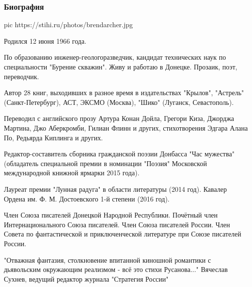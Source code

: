  
 
 

\subsubsection{Биография}

\ifcmt
pic https://stihi.ru/photos/brendarcher.jpg
\fi

Родился 12 июня 1966 года.

По образованию инженер-геологоразведчик, кандидат технических наук по
специальности "Бурение скважин". Живу и работаю в Донецке.  Прозаик, поэт,
переводчик.

Автор 28 книг, выходивших в разное время в издательствах "Крылов", "Астрель"
(Санкт-Петербург), АСТ, ЭКСМО (Москва), "Шико" (Луганск, Севастополь).

Переводил с английского прозу Артура Конан Дойла, Грегори Киза, Джорджа
Мартина, Джо Аберкромби, Гилиан Флинн и других, стихотворения Эдгара Алана По,
Редьярда Киплинга и других.

Редактор-составитель сборника гражданской поэзии Донбасса "Час мужества"
(обладатель специальной премии в номинации "Поэзия" Московской международной
книжной ярмарки 2015 года).

Лауреат премии "Лунная радуга" в области литературы (2014 год).  Кавалер Ордена
им. Ф. М. Достоевского 1-й степени (2016 год).

Член Союза писателей Донецкой Народной Республики. Почётный член
Интернационального Союза писателей. Член Союза писателей России. Член Совета по
фантастической и приключенческой литературе при Союзе писателей России.

"Отважная фантазия, столкновение впитанной киношной романтики с дьявольским
окружающим реализмом - всё это стихи Русанова..." Вячеслав Сухнев, ведущий
редактор журнала "Стратегия России"
